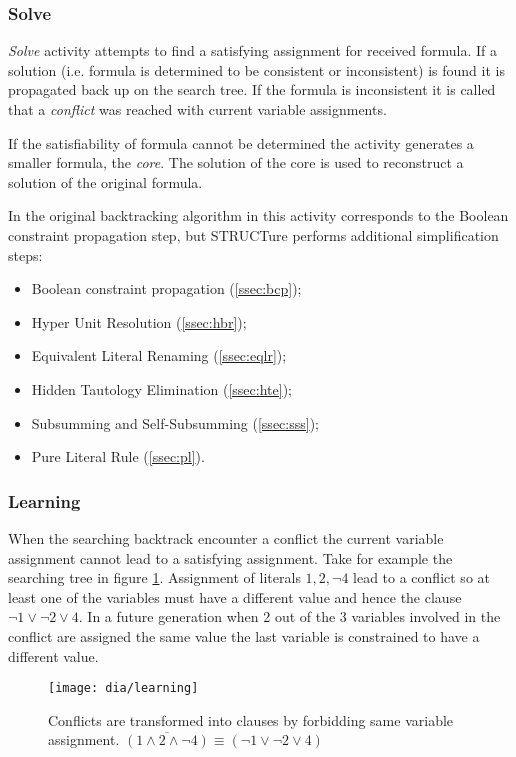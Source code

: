 \subsubsection{Solve}
\label{sssec:solve}

\emph{Solve} activity attempts to find a satisfying assignment for
received formula. If a solution (i.e.  formula is determined to be
consistent or inconsistent) is found it is propagated back up on
the search tree. If the formula is inconsistent it is called that
a \emph{conflict} was reached with current variable assignments.

If the satisfiability of formula cannot be determined the activity
generates a smaller formula, the \emph{core}. The solution of the
core is used to reconstruct a solution of the original
formula.

In the original backtracking algorithm in
\cite{Davis:1960:CPQ:321033.321034} this activity corresponds to
the Boolean constraint propagation step, but STRUCTure performs
additional simplification steps:
\begin{itemize}
  \item Boolean constraint propagation (\ref{ssec:bcp});
  \item Hyper Unit Resolution (\ref{ssec:hbr});
  \item Equivalent Literal Renaming (\ref{ssec:eqlr});
  \item Hidden Tautology Elimination (\ref{ssec:hte});
  \item Subsumming and Self-Subsumming (\ref{ssec:sss});
  \item Pure Literal Rule (\ref{ssec:pl}).
\end{itemize}


\subsubsection{Learning}
\label{sssec:learning}

When the searching backtrack encounter a conflict the current
variable assignment cannot lead to a satisfying assignment.
Take for example the searching tree in figure \ref{fig:learning}.
Assignment of literals $1, 2, \neg 4$ lead to a conflict so at
least one of the variables must have a different value and hence the
clause $\neg 1 \lor \neg 2 \lor 4$.  In a future generation when 2
out of the 3 variables involved in the conflict are assigned the same
value the last variable is constrained to have a different value.

\begin{figure}
  \centering
  \texttt{[image: dia/learning]}
  \caption{Conflicts are transformed into clauses by forbidding
  same variable assignment.
  $\overline{(1 \land 2 \land \neg 4)} \equiv (\neg 1 \lor \neg 2 \lor 4)$}
  \label{fig:learning}
\end{figure}

